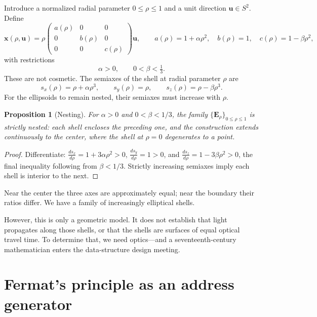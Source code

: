 \documentclass[11pt]{article}
\newtheorem{proposition}[theorem]{Proposition}
\newcommand{\xv}{\mathbf{x}}
\newcommand{\uv}{\mathbf{u}}
\begin{document}
Introduce a normalized radial parameter $0 \le \rho \le 1$ and a unit direction
$\uv \in S^2$. Define
\begin{equation}
\xv(\rho,\uv) = \rho
\begin{pmatrix} a(\rho) & 0 & 0 \\ 0 & b(\rho) & 0 \\ 0 & 0 & c(\rho) \end{pmatrix}
\uv,
\qquad
a(\rho) = 1 + \alpha\rho^2, \quad b(\rho) = 1, \quad c(\rho) = 1 - \beta\rho^2,
\end{equation}
with restrictions
\begin{equation}
\boxed{\alpha > 0, \qquad 0 < \beta < \tfrac13.}
\end{equation}
These are not cosmetic. The semiaxes of the shell at radial parameter $\rho$ are
\begin{equation}
s_x(\rho) = \rho + \alpha\rho^3, \qquad s_y(\rho) = \rho, \qquad s_z(\rho) = \rho - \beta\rho^3.
\end{equation}
For the ellipsoids to remain nested, their semiaxes must increase with $\rho$.

\begin{proposition}[Nesting]\label{prop:nesting}
For $\alpha > 0$ and $0 < \beta < 1/3$, the family
$\{\mathbf{E}_\rho\}_{0 \le \rho \le 1}$ is strictly nested: each shell encloses the
preceding one, and the construction extends continuously to the center, where the
shell at $\rho=0$ degenerates to a point.
\end{proposition}
\begin{proof}
Differentiate: $\frac{ds_x}{d\rho} = 1 + 3\alpha\rho^2 > 0$,
$\frac{ds_y}{d\rho} = 1 > 0$, and $\frac{ds_z}{d\rho} = 1 - 3\beta\rho^2 > 0$, the
final inequality following from $\beta < 1/3$. Strictly increasing semiaxes imply each
shell is interior to the next.
\end{proof}

Near the center the three axes are approximately equal; near the boundary their ratios
differ. We have a family of increasingly elliptical shells.

However, this is only a geometric model. It does not establish that light propagates
along those shells, or that the shells are surfaces of equal optical travel time. To
determine that, we need optics---and a seventeenth-century mathematician enters the
data-structure design meeting.

\section{Fermat's principle as an address generator}\label{sec:fermat}
\end{document}
